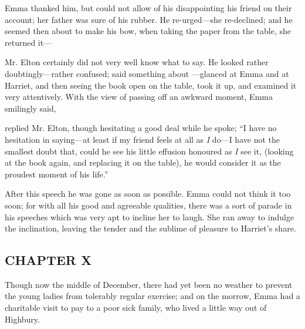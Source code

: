 Emma thanked him, but could not allow of his disappointing his friend on their account; her father was sure of his rubber. He re-urged---she re-declined; and he seemed then about to make his bow, when taking the paper from the table, she returned it---


Mr. Elton certainly did not very well know what to say. He looked rather doubtingly---rather confused; said something about ---glanced at Emma and at Harriet, and then seeing the book open on the table, took it up, and examined it very attentively. With the view of passing off an awkward moment, Emma smilingly said,


 replied Mr. Elton, though hesitating a good deal while he spoke; “I have no hesitation in saying---at least if my friend feels at all as {\em I} do---I have not the smallest doubt that, could he see his little effusion honoured as {\em I} see it, (looking at the book again, and replacing it on the table), he would consider it as the proudest moment of his life.”

After this speech he was gone as soon as possible. Emma could not think it too soon; for with all his good and agreeable qualities, there was a sort of parade in his speeches which was very apt to incline her to laugh. She ran away to indulge the inclination, leaving the tender and the sublime of pleasure to Harriet's share.

\subsection[chapter-x]{\useURL[url10][][][]\from[url10]CHAPTER X}

Though now the middle of December, there had yet been no weather to prevent the young ladies from tolerably regular exercise; and on the morrow, Emma had a charitable visit to pay to a poor sick family, who lived a little way out of Highbury.

